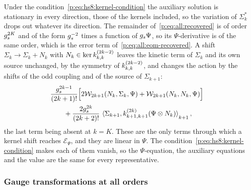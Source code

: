 Under the condition~\eqref{p:eq:hs8:kernel-condition} the auxiliary solution is stationary in every direction, those of the kernels included, so the variation of $\Sigma_k^*$ drops out whatever its direction.
The remainder of~\eqref{p:eq:all:recovered} is of order $g_s^{2 K}$ and of the form $g_s^{-2}$ times a function of $g_s \Psi$, so its $\Psi$-derivative is of the same order, which is the error term of~\eqref{p:eq:all:eom-recovered}.
A shift $\Sigma_k \to \Sigma_k + N_k$ with $N_k \in \ker \kin{k}{}{2 k - 2}$ leaves the kinetic term of $\Sigma_k$ and its own source unchanged, by the symmetry of $\kin{k}{}{2 k - 2}$, and changes the action by the shifts of the odd coupling and of the source of $\Sigma_{k + 1}$:
\begin{equation}
  \label{p:eq:all:kernel-shift}
  \begin{aligned}
    &
    \frac{\gs^{2 k - 1}}{(2 k + 1)!} \Big[
      2 \dvertex{2 k + 1}(N_k, \Sigma_k, \Psi)
      + \dvertex{2 k + 1}(N_k, N_k, \Psi)
    \Big]
    \\ &
    \qquad
    + \frac{2 \gs^{2 k}}{(2 k + 2)!} \, \pair[k + 1]{\Sigma_{k + 1}}{\kin{k + 1}{}{2 k}(\Psi \otimes N_k)},
  \end{aligned}
\end{equation}
the last term being absent at $k = K$.
These are the only terms through which a kernel shift reaches $\mathcal E_\Psi$, and they are linear in $\Psi$.
The condition~\eqref{p:eq:hs8:kernel-condition} makes each of them vanish, so the $\Psi$-equation, the auxiliary equations and the value are the same for every representative.

\subsubsection{Gauge transformations at all orders}
\label{p:sec:all:gauge}

